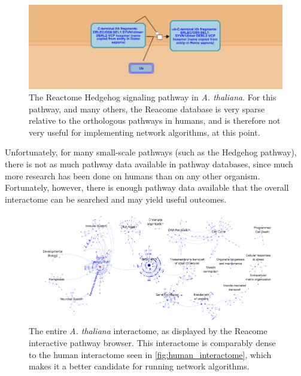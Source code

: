 \documentclass[12pt,twoside]{reedthesis}
\theoremstyle{definition}
\begin{document}
   \begin{figure}[h]
     \begin{center}
       \includegraphics[width=\textwidth]{at_hh}
     \caption[\textit{Arabidopsis thaliana} Hedgehog pathway]{The Reactome Hedgehog signaling pathway in \textit{A. thaliana}. For this pathway, and many others, the Reacome database is very sparse relative to the orthologous pathways in humans, and is therefore not very useful for implementing network algorithms, at this point.}
     \label{fig:at_hh}
     \end{center}
   \end{figure}

   Unfortunately, for many small-scale pathways (such as the Hedgehog pathway), there is not as much pathway data available in pathway databases, since much more research has been done on humans than on any other organism. Fortunately, however, there is enough pathway data available that the overall interactome can be searched and may yield useful outcomes.\par

   \begin{figure}[h]
     \begin{center}
       \includegraphics[width=\textwidth]{at_interactome}
     \caption[\textit{Arabidopsis thaliana} interactome]{The entire \textit{A. thaliana}  interactome, as displayed by the Reacome interactive pathway browser. This interactome is comparably dense to the human interactome seen in \ref{fig:human_interactome}, which makes it a better candidate for running network algorithms.}
     \label{fig:at_interactome}
     \end{center}
   \end{figure}
\end{document}
